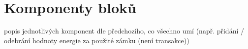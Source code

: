 


\section{Komponenty bloků}



popis jednotlivých komponent dle předchozího, co všechno umí (např. přidání / odebrání hodnoty energie za použité zámku (není transakce))



